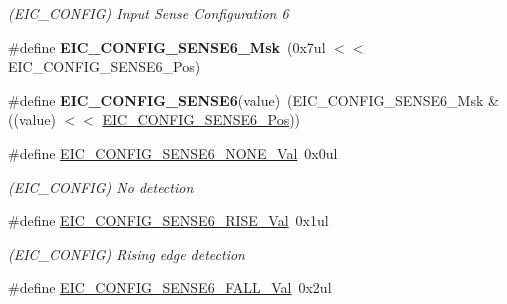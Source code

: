 \begin{DoxyCompactItemize}
\begin{DoxyCompactList}\small\item\em (E\+I\+C\+\_\+\+C\+O\+N\+F\+I\+G) Input Sense Configuration 6 \end{DoxyCompactList}\item 
\hypertarget{group___s_a_m_l21___e_i_c_gac684b5c6844dd155ee1507dbb1e83d87}{}\#define {\bfseries E\+I\+C\+\_\+\+C\+O\+N\+F\+I\+G\+\_\+\+S\+E\+N\+S\+E6\+\_\+\+Msk}~(0x7ul $<$$<$ E\+I\+C\+\_\+\+C\+O\+N\+F\+I\+G\+\_\+\+S\+E\+N\+S\+E6\+\_\+\+Pos)\label{group___s_a_m_l21___e_i_c_gac684b5c6844dd155ee1507dbb1e83d87}

\item 
\hypertarget{group___s_a_m_l21___e_i_c_ga8cd719665a49e3077bf14150693a94d7}{}\#define {\bfseries E\+I\+C\+\_\+\+C\+O\+N\+F\+I\+G\+\_\+\+S\+E\+N\+S\+E6}(value)~(E\+I\+C\+\_\+\+C\+O\+N\+F\+I\+G\+\_\+\+S\+E\+N\+S\+E6\+\_\+\+Msk \& ((value) $<$$<$ \hyperlink{group___s_a_m_l21___e_i_c_ga17d194da98be0777ff750650293d386d}{E\+I\+C\+\_\+\+C\+O\+N\+F\+I\+G\+\_\+\+S\+E\+N\+S\+E6\+\_\+\+Pos}))\label{group___s_a_m_l21___e_i_c_ga8cd719665a49e3077bf14150693a94d7}

\item 
\hypertarget{group___s_a_m_l21___e_i_c_ga9c966fa77b4176c92e747e52084cfbd8}{}\#define \hyperlink{group___s_a_m_l21___e_i_c_ga9c966fa77b4176c92e747e52084cfbd8}{E\+I\+C\+\_\+\+C\+O\+N\+F\+I\+G\+\_\+\+S\+E\+N\+S\+E6\+\_\+\+N\+O\+N\+E\+\_\+\+Val}~0x0ul\label{group___s_a_m_l21___e_i_c_ga9c966fa77b4176c92e747e52084cfbd8}

\begin{DoxyCompactList}\small\item\em (E\+I\+C\+\_\+\+C\+O\+N\+F\+I\+G) No detection \end{DoxyCompactList}\item 
\hypertarget{group___s_a_m_l21___e_i_c_ga6a5001e8379757251033150764c6dcba}{}\#define \hyperlink{group___s_a_m_l21___e_i_c_ga6a5001e8379757251033150764c6dcba}{E\+I\+C\+\_\+\+C\+O\+N\+F\+I\+G\+\_\+\+S\+E\+N\+S\+E6\+\_\+\+R\+I\+S\+E\+\_\+\+Val}~0x1ul\label{group___s_a_m_l21___e_i_c_ga6a5001e8379757251033150764c6dcba}

\begin{DoxyCompactList}\small\item\em (E\+I\+C\+\_\+\+C\+O\+N\+F\+I\+G) Rising edge detection \end{DoxyCompactList}\item 
\hypertarget{group___s_a_m_l21___e_i_c_gaa3b18a5b6647f583a1b276ad9b5aa4d6}{}\#define \hyperlink{group___s_a_m_l21___e_i_c_gaa3b18a5b6647f583a1b276ad9b5aa4d6}{E\+I\+C\+\_\+\+C\+O\+N\+F\+I\+G\+\_\+\+S\+E\+N\+S\+E6\+\_\+\+F\+A\+L\+L\+\_\+\+Val}~0x2ul\label{group___s_a_m_l21___e_i_c_gaa3b18a5b6647f583a1b276ad9b5aa4d6}


\end{DoxyCompactItemize}
